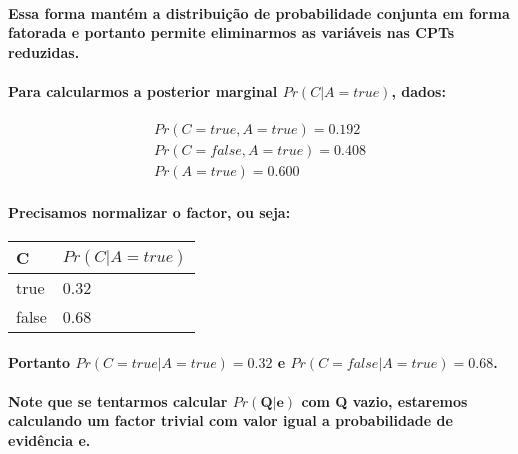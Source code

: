 \documentclass[a4paper,10pt]{article}
\theoremstyle{plain}
\begin{document}
\paragraph{
  Essa forma mantém a distribuição de probabilidade conjunta em forma fatorada e portanto permite
  eliminarmos as variáveis nas CPTs reduzidas.
}

\paragraph{
  Para calcularmos a posterior marginal $Pr(C|A=true)$, dados:
}

\begin{equation}
  \begin{split}
    Pr(C=true, A=true) = 0.192 \\
    Pr(C=false, A=true) = 0.408 \\
    Pr(A=true) = 0.600 
  \end{split}
\end{equation}

\paragraph{
  Precisamos normalizar o factor, ou seja:
}

\begin{table}[h]
  \begin{center}
    \begin{tabular}{l | l}
      C & $Pr(C|A=true)$ \\
      \hline
      true & 0.32 \\
      false & 0.68 \\
    \end{tabular}
  \end{center}
\end{table}

\paragraph{
  Portanto $Pr(C=true|A=true) = 0.32$ e $Pr(C=false|A=true) = 0.68$.
}

\paragraph{
  Note que se tentarmos calcular $Pr(\textbf{Q}|\textbf{e})$ com \textbf{Q} vazio, estaremos
  calculando um factor trivial com valor igual a probabilidade de evidência \textbf{e}.
}
\end{document}
